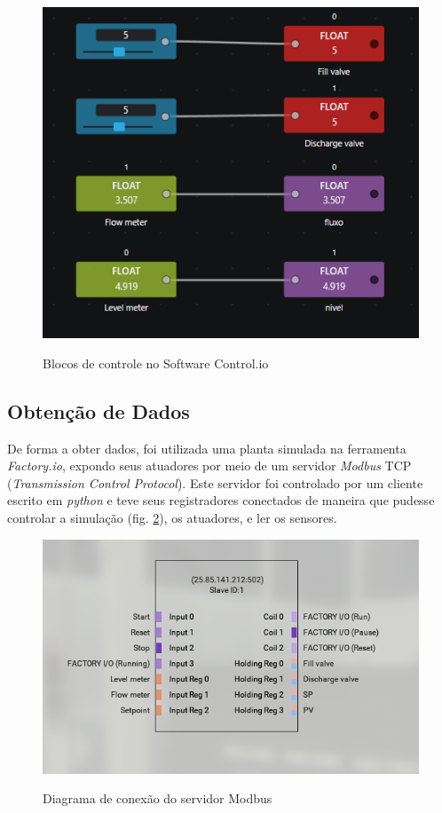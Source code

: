 \documentclass[
	article,			%
	11pt,				%
	oneside,			%
	a4paper,			%
	section=TITLE,		%
	english,			%
	brazil,				%
	sumario=tradicional
	]{abntex2}
\newcommand{\factorio}{\textit{Factory.io}}%
\begin{document}
\begin{figure}[H]
    \centering
    \caption{Blocos de controle no Software Control.io}
    \includegraphics[width=.6\textwidth]{img/control io.PNG}
    \label{fig:control-io}
\end{figure}

\subsection{Obtenção de Dados}
\label{ssec:obt-dados}
De forma a obter dados, foi utilizada uma planta simulada na ferramenta \factorio, expondo seus atuadores por meio de um servidor \textit{Modbus} TCP (\textit{Transmission Control Protocol}). Este servidor foi controlado por um cliente escrito em \textit{python} e teve seus registradores conectados de maneira que pudesse controlar a simulação (fig. \ref{fig:conn-modbus}), os atuadores, e ler os sensores. 

\begin{figure}[H]
    \centering
    \caption{Diagrama de conexão do servidor Modbus}
    \includegraphics[width=\textwidth]{img/neg-factio-modbus-conn.png}
    \label{fig:conn-modbus}
\end{figure}
\end{document}

